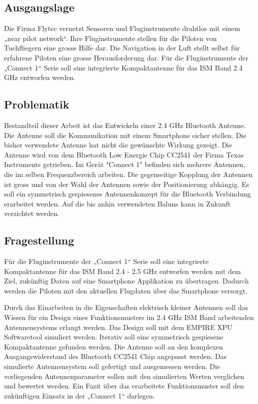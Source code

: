\subsection{Ausgangslage}
Die Firma Flytec vernetzt Sensoren und Fluginstrumente drahtlos mit einem  „near pilot network“. Ihre Fluginstrumente stellen für die Piloten von Tuchfliegern eine grosse Hilfe dar. Die Navigation in der Luft stellt selbst für erfahrene Piloten eine grosse Herausforderung dar. Für die Fluginstrumente der „Connect 1“ Serie  soll eine integrierte Kompaktantenne für das ISM Band 2.4 GHz entworfen werden. 

\subsection{Problematik}
Bestandteil dieser Arbeit ist das Entwickeln einer 2.4 GHz Bluetooth Antenne. Die Antenne soll die Kommunikation mit einem Smartphone sicher stellen. Die bisher verwendete Antenne hat nicht die gewünschte Wirkung gezeigt. Die Antenne wird von dem Bluetooth Low Energie Chip CC2541 der Firma Texas Instruments getrieben. Im Gerät "Connect 1" befinden sich mehrere Antennen, die im selben Frequenzbereich arbeiten. Die gegenseitige Kopplung der Antennen ist gross und von der Wahl der Antennen sowie der Positionierung abhängig. Es soll ein  symmetrisch gespiesenes Antennenkonzept für die Bluetooth Verbindung erarbeitet werden. Auf die bis anhin verwendeten Baluns kann in Zukunft verzichtet werden.
\subsection{Fragestellung}
Für die Fluginstrumente der „Connect 1“ Serie  soll eine integrierte Kompaktantenne für das ISM Band 2.4 - 2.5 GHz entworfen werden mit dem Ziel, zukünftig Daten auf eine Smartphone Applikation zu übertragen. Dadurch werden die Piloten mit den aktuellen Flugdaten über das Smartphone  versorgt. 

Durch das Einarbeiten in die Eigenschaften elektrisch kleiner Antennen soll das Wissen für ein Design eines Funktionsmusters  im 2.4 GHz ISM Band arbeitenden Antennensystems erlangt werden. Das Design soll mit dem EMPIRE XPU Softwaretool simuliert werden. Iterativ soll eine symmetrisch gespiesene Kompaktantenne gefunden werden. Die Antenne soll an den komplexen Ausgangswiderstand des Bluetooth CC2541 Chip angepasst werden. Das simulierte Antennensystem soll gefertigt und ausgemessen werden. Die vorliegenden Antennenparameter sollen mit den simulierten Werten verglichen und bewertet werden. Ein Fazit über das erarbeitete Funktionsmuster soll den zukünftigen Einsatz in der „Connect 1“ darlegen.
